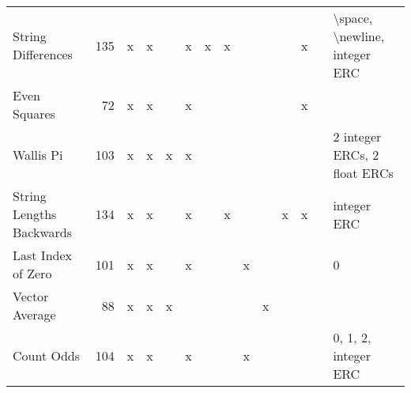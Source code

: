 \documentclass{sig-alternate}
\begin{document}
\begin{table*}
\begin{tabular}{>{\raggedright}p{3.1cm}rccccccccccc>{\raggedright}p{5.5cm}}
String Differences         & 135             & x    & x       &       & x       & x    & x      &                    &                  &                   & x     &            & \textbackslash space, \textbackslash newline, integer ERC                                                                                                                                                                   \tabularnewline
Even Squares               & 72              & x    & x       &       & x       &      &        &                    &                  &                   & x     &            &                                                                                                                                                                                                                             \tabularnewline
Wallis Pi                  & 103             & x    & x       & x     & x       &      &        &                    &                  &                   &       &            & 2 integer ERCs, 2 float ERCs                                                                                                                                                                                                \tabularnewline
String Lengths Backwards   & 134             & x    & x       &       & x       &      & x      &                    &                  & x                 & x     &            & integer ERC                                                                                                                                                                                                                 \tabularnewline
Last Index of Zero         & 101             & x    & x       &       & x       &      &        & x                  &                  &                   &       &            & 0                                                                                                                                                                                                                           \tabularnewline
Vector Average             & 88              & x    & x       & x     &         &      &        &                    & x                &                   &       &            &                                                                                                                                                                                                                             \tabularnewline
Count Odds                 & 104             & x    & x       &       & x       &      &        & x                  &                  &                   &       &            & 0, 1, 2, integer ERC                                                                                                                                                                                                        \tabularnewline

\end{tabular}
\end{table*}
\end{document}
